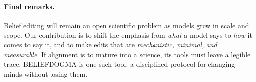 \documentclass[11pt]{article}
\begin{document}
\paragraph{Final remarks.}
Belief editing will remain an open scientific problem as models grow in scale and scope. Our contribution is to shift the emphasis from \emph{what} a model says to \emph{how} it comes to say it, and to make edits that are \emph{mechanistic, minimal, and measurable}. If alignment is to mature into a science, its tools must leave a legible trace. \textsc{BELIEF\textendash DOGMA} is one such tool: a disciplined protocol for changing minds without losing them.



% 
\clearpage
\newpage






%
\clearpage
\newpage
%
%
%
\end{document}

